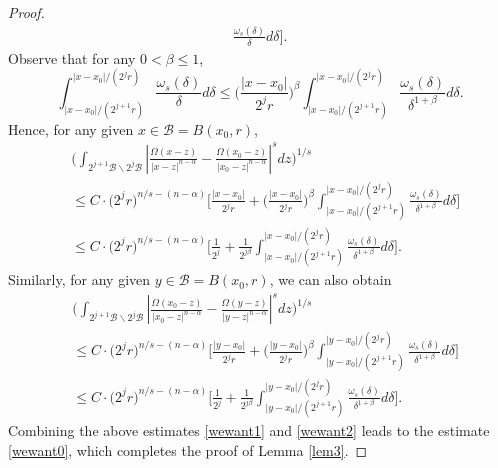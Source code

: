 \documentclass[10pt,a4paper]{amsart}
\begin{document}
\begin{proof}
\begin{equation*}
\begin{split}
\frac{\omega_s(\delta)}{\delta}d\delta\bigg].
\end{split}
\end{equation*}
Observe that for any $0<\beta\leq1$,
\begin{equation*}
\int_{|x-x_0|/{(2^{j+1}r)}}^{|x-x_0|/{(2^jr)}}\frac{\omega_s(\delta)}{\delta}d\delta
\leq\Big(\frac{|x-x_0|}{2^{j}r}\Big)^{\beta}
\int_{|x-x_0|/{(2^{j+1}r)}}^{|x-x_0|/{(2^jr)}}\frac{\omega_s(\delta)}{\delta^{1+\beta}}d\delta.
\end{equation*}
Hence, for any given $x\in \mathcal{B}=B(x_0,r)$,
\begin{equation}\label{wewant1}
\begin{split}
&\bigg(\int_{2^{j+1}\mathcal{B}\backslash2^j\mathcal{B}}
\left|\frac{\Omega(x-z)}{|x-z|^{n-\alpha}}-\frac{\Omega(x_0-z)}{|x_0-z|^{n-\alpha}}\right|^sdz\bigg)^{1/s}\\
&\leq C\cdot\big(2^jr\big)^{n/s-(n-\alpha)}\bigg[\frac{|x-x_0|}{2^jr}+\Big(\frac{|x-x_0|}{2^{j}r}\Big)^{\beta}
\int_{|x-x_0|/{(2^{j+1}r)}}^{|x-x_0|/{(2^jr)}}\frac{\omega_s(\delta)}{\delta^{1+\beta}}d\delta\bigg]\\
&\leq C\cdot\big(2^jr\big)^{n/s-(n-\alpha)}\bigg[\frac{1}{2^j}+\frac{1}{2^{j\beta}}
\int_{|x-x_0|/{(2^{j+1}r)}}^{|x-x_0|/{(2^jr)}}\frac{\omega_s(\delta)}{\delta^{1+\beta}}d\delta\bigg].
\end{split}
\end{equation}
Similarly, for any given $y\in \mathcal{B}=B(x_0,r)$, we can also obtain
\begin{equation}\label{wewant2}
\begin{split}
&\bigg(\int_{2^{j+1}\mathcal{B}\backslash 2^j\mathcal{B}}
\left|\frac{\Omega(x_0-z)}{|x_0-z|^{n-\alpha}}-\frac{\Omega(y-z)}{|y-z|^{n-\alpha}}\right|^sdz\bigg)^{1/s}\\
&\leq C\cdot\big(2^jr\big)^{n/s-(n-\alpha)}
\bigg[\frac{|y-x_0|}{2^jr}+\Big(\frac{|y-x_0|}{2^{j}r}\Big)^{\beta}
\int_{|y-x_0|/{(2^{j+1}r)}}^{|y-x_0|/{(2^jr)}}\frac{\omega_s(\delta)}{\delta^{1+\beta}}d\delta\bigg]\\
&\leq C\cdot\big(2^jr\big)^{n/s-(n-\alpha)}
\bigg[\frac{1}{2^j}+\frac{1}{2^{j\beta}}
\int_{|y-x_0|/{(2^{j+1}r)}}^{|y-x_0|/{(2^jr)}}\frac{\omega_s(\delta)}{\delta^{1+\beta}}d\delta\bigg].
\end{split}
\end{equation}
Combining the above estimates \eqref{wewant1} and \eqref{wewant2} leads to the estimate \eqref{wewant0}, which completes the proof of Lemma \ref{lem3}.
\end{proof}
\end{document}
